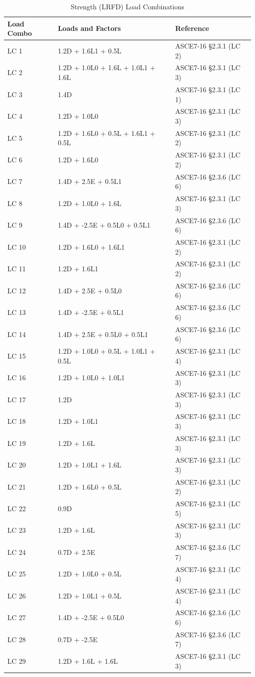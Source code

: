 \documentclass[12pt, fleqn]{article}
\begin{document}
\begin{table}[H]
\caption{Strength (LRFD) Load Combinations}
\centering
\begin{tabular}{l l l}
\hline
Load Combo & Loads and Factors & Reference\\
\hline
LC 1 & 1.2D + 1.6L1 + 0.5L\textsubscriptr1 & ASCE7-16 \S2.3.1 (LC 2)\\
LC 2 & 1.2D + 1.0L0 + 1.6L\textsubscriptr0 + 1.0L1 + 1.6L\textsubscriptr1 & ASCE7-16 \S2.3.1 (LC 3)\\
LC 3 & 1.4D & ASCE7-16 \S2.3.1 (LC 1)\\
LC 4 & 1.2D + 1.0L0 & ASCE7-16 \S2.3.1 (LC 3)\\
LC 5 & 1.2D + 1.6L0 + 0.5L\textsubscriptr0 + 1.6L1 + 0.5L\textsubscriptr1 & ASCE7-16 \S2.3.1 (LC 2)\\
LC 6 & 1.2D + 1.6L0 & ASCE7-16 \S2.3.1 (LC 2)\\
LC 7 & 1.4D + 2.5E + 0.5L1 & ASCE7-16 \S2.3.6 (LC 6)\\
LC 8 & 1.2D + 1.0L0 + 1.6L\textsubscriptr0 & ASCE7-16 \S2.3.1 (LC 3)\\
LC 9 & 1.4D + -2.5E + 0.5L0 + 0.5L1 & ASCE7-16 \S2.3.6 (LC 6)\\
LC 10 & 1.2D + 1.6L0 + 1.6L1 & ASCE7-16 \S2.3.1 (LC 2)\\
LC 11 & 1.2D + 1.6L1 & ASCE7-16 \S2.3.1 (LC 2)\\
LC 12 & 1.4D + 2.5E + 0.5L0 & ASCE7-16 \S2.3.6 (LC 6)\\
LC 13 & 1.4D + -2.5E + 0.5L1 & ASCE7-16 \S2.3.6 (LC 6)\\
LC 14 & 1.4D + 2.5E + 0.5L0 + 0.5L1 & ASCE7-16 \S2.3.6 (LC 6)\\
LC 15 & 1.2D + 1.0L0 + 0.5L\textsubscriptr0 + 1.0L1 + 0.5L\textsubscriptr1 & ASCE7-16 \S2.3.1 (LC 4)\\
LC 16 & 1.2D + 1.0L0 + 1.0L1 & ASCE7-16 \S2.3.1 (LC 3)\\
LC 17 & 1.2D & ASCE7-16 \S2.3.1 (LC 3)\\
LC 18 & 1.2D + 1.0L1 & ASCE7-16 \S2.3.1 (LC 3)\\
LC 19 & 1.2D + 1.6L\textsubscriptr1 & ASCE7-16 \S2.3.1 (LC 3)\\
LC 20 & 1.2D + 1.0L1 + 1.6L\textsubscriptr1 & ASCE7-16 \S2.3.1 (LC 3)\\
LC 21 & 1.2D + 1.6L0 + 0.5L\textsubscriptr0 & ASCE7-16 \S2.3.1 (LC 2)\\
LC 22 & 0.9D & ASCE7-16 \S2.3.1 (LC 5)\\
LC 23 & 1.2D + 1.6L\textsubscriptr0 & ASCE7-16 \S2.3.1 (LC 3)\\
LC 24 & 0.7D + 2.5E & ASCE7-16 \S2.3.6 (LC 7)\\
LC 25 & 1.2D + 1.0L0 + 0.5L\textsubscriptr0 & ASCE7-16 \S2.3.1 (LC 4)\\
LC 26 & 1.2D + 1.0L1 + 0.5L\textsubscriptr1 & ASCE7-16 \S2.3.1 (LC 4)\\
LC 27 & 1.4D + -2.5E + 0.5L0 & ASCE7-16 \S2.3.6 (LC 6)\\
LC 28 & 0.7D + -2.5E & ASCE7-16 \S2.3.6 (LC 7)\\
LC 29 & 1.2D + 1.6L\textsubscriptr0 + 1.6L\textsubscriptr1 & ASCE7-16 \S2.3.1 (LC 3)\\
\hline
\end{tabular}
\end{table}
\end{document}
